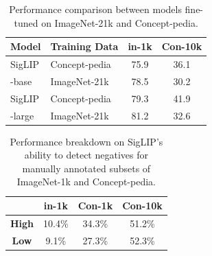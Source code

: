 \documentclass[11pt]{article}
\newcommand{\resource}{Concept-pedia}
\begin{document}
\begin{table}[t]
    \centering
    \label{tab:model_comparison}
    \begin{tabular}{llcc}
        \toprule
        \textbf{Model}       & \textbf{Training Data} & \textbf{in-1k} & \textbf{Con-10k} \\ 
        \midrule
         SigLIP & \resource & 75.9   & 36.1  \\ 
          -base  & ImageNet-21k       & 78.5                  & 30.2                  \\ 
          \midrule
        SigLIP & \resource       & 79.3  & 41.9                    \\
              -large & ImageNet-21k   & 81.2                   & 32.6                  \\ 
              \bottomrule
    \end{tabular}
    \caption{Performance comparison between models fine-tuned on ImageNet-21k and \resource.}
    \label{tab:21k-train}
\end{table}

\begin{table}[t]
\raggedright
\setlength{\tabcolsep}{11pt} 

\begin{tabular}{cccc}

\toprule
\textbf{}    & \textbf{in-1k} & \textbf{Con-1k} & \textbf{Con-10k} \\ \midrule
\textbf{High}   & 10.4\%               & 34.3\%                            & 51.2\%                                      \\ \midrule
\textbf{Low} & \hspace{0.4em}9.1\%                & 27.3\%                            & 52.3\%          \\ 
\bottomrule
\end{tabular}
\caption{Performance breakdown on SigLIP's ability to detect negatives for manually annotated subsets of ImageNet-1k and Concept-pedia.}
\label{tab:neg_det_breakdown}
\end{table}
\end{document}
